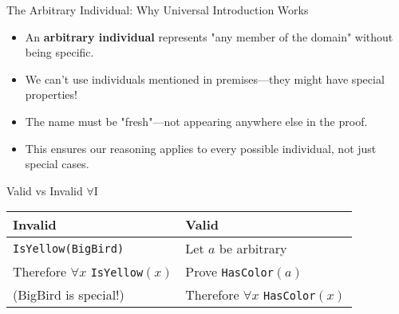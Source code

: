 \documentclass{beamer}
\begin{document}
	\begin{frame}{The Arbitrary Individual: Why Universal Introduction Works}
		\begin{itemize}
			\item An \textbf{arbitrary individual} represents "any member of the domain" without being specific.
			\item We can't use individuals mentioned in premises—they might have special properties!
			\item The name must be "fresh"—not appearing anywhere else in the proof.
			\item This ensures our reasoning applies to every possible individual, not just special cases.
		\end{itemize}
		
		\begin{alertblock}{Valid vs Invalid $\forall$I}
			\begin{tabular}{|l|l|}
				\hline
				\textbf{Invalid} & \textbf{Valid} \\
				\hline
				\texttt{IsYellow(BigBird)} & Let $a$ be arbitrary \\
				Therefore $\forall x$ \texttt{IsYellow}$(x)$ & Prove \texttt{HasColor}$(a)$ \\
				(BigBird is special!) & Therefore $\forall x$ \texttt{HasColor}$(x)$ \\
				\hline
			\end{tabular}
		\end{alertblock}
	\end{frame}
	
\end{document}
